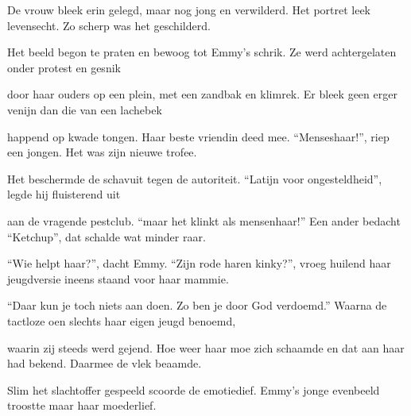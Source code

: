 De vrouw bleek erin gelegd,
maar nog jong en verwilderd.
Het portret leek levensecht.
Zo scherp was het geschilderd.

Het beeld begon te praten
en bewoog tot Emmy’s schrik.
Ze werd achtergelaten
onder protest en gesnik

door haar ouders op een plein,
met een zandbak en klimrek.
Er bleek geen erger venijn
dan die van een lachebek

happend op kwade tongen.
Haar beste vriendin deed mee.
“Menseshaar!”, riep een jongen.
Het was zijn nieuwe trofee.

Het beschermde de schavuit
tegen de autoriteit.
“Latijn voor ongesteldheid”,
legde hij fluisterend uit

aan de vragende pestclub.
“maar het klinkt als mensenhaar!”
Een ander bedacht “Ketchup”,
dat schalde wat minder raar.

“Wie helpt haar?”, dacht Emmy.
“Zijn rode haren kinky?”,
vroeg huilend haar jeugdversie
ineens staand voor haar mammie.

“Daar kun je toch niets aan doen.
Zo ben je door God verdoemd.”
Waarna de tactloze oen
slechts haar eigen jeugd benoemd,

waarin zij steeds werd gejend.
Hoe weer haar moe zich schaamde
en dat aan haar had bekend.
Daarmee de vlek beaamde.

Slim het slachtoffer gespeeld
scoorde de emotiedief.
Emmy’s jonge evenbeeld
troostte maar haar moederlief.
